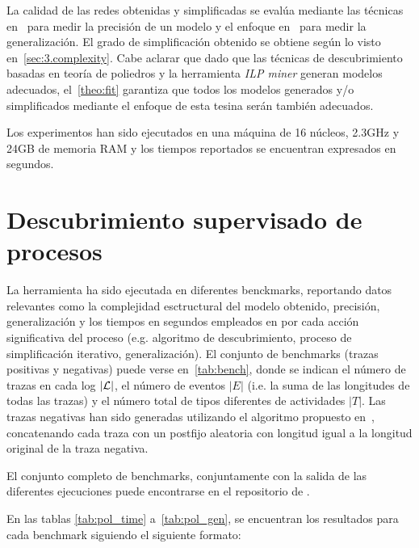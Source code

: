 La calidad de las redes obtenidas y simplificadas se evalúa mediante las técnicas en~\cite{AMCDA15} para medir
la precisión de un modelo y el enfoque en~\cite{BrouckeWVB14} para medir la generalización. El grado de
simplificación obtenido se obtiene según lo visto en~\autoref{sec:3.complexity}.
Cabe aclarar que dado que las técnicas de descubrimiento basadas en teoría de poliedros y la herramienta \textit{ILP miner}
generan modelos adecuados, el~\autoref{theo:fit} garantiza que todos los modelos generados y/o simplificados
mediante el enfoque de esta tesina serán también adecuados.

Los experimentos han sido ejecutados en una máquina de 16 núcleos, 2.3GHz y 24GB de memoria RAM y los tiempos
reportados se encuentran expresados en segundos.

\section{Descubrimiento supervisado de procesos}
\label{sec:4.supervised}



La herramienta ha sido ejecutada en diferentes benckmarks, reportando datos relevantes como la 
complejidad esctructural del modelo obtenido, precisión, generalización y los tiempos en segundos 
empleados en por cada acción significativa del proceso (e.g. algoritmo de descubrimiento,
proceso de simplificación iterativo, generalización).
El conjunto de benchmarks (trazas positivas y negativas) puede verse en~\autoref{tab:bench}, donde se
indican el número de trazas en cada log $|{\mathcal L}|$, el número de eventos $|E|$ (i.e. la suma de las 
longitudes de todas las trazas) y el número total de tipos diferentes de actividades $|T|$.
Las trazas negativas han sido generadas utilizando el algoritmo propuesto en~\cite{BrouckeWVB14},
concatenando cada traza con un postfijo aleatoria con longitud igual a la longitud original de la traza
negativa.

El conjunto completo de benchmarks, conjuntamente con la salida de las diferentes ejecuciones puede 
encontrarse en el repositorio de \pachtool.

En las tablas \ref{tab:pol_time} a~\ref{tab:pol_gen}, se encuentran los resultados para cada benchmark siguiendo
el siguiente formato:

